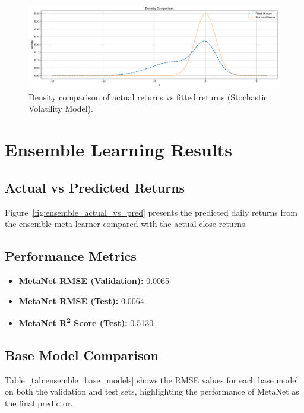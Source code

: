 \begin{figure}[h!]
    \centering
    \includegraphics[width=\textwidth]{Images/stochastic_volatility_density.pdf}
    \caption{Density comparison of actual returns vs fitted returns (Stochastic Volatility Model).}
    \label{fig:sv_density}
\end{figure}

\section{Ensemble Learning Results}

\subsection{Actual vs Predicted Returns}
Figure~\ref{fig:ensemble_actual_vs_pred} presents the predicted daily returns from the ensemble meta-learner compared with the actual close returns.

\subsection{Performance Metrics}
\begin{itemize}
    \item \textbf{MetaNet RMSE (Validation):} 0.0065
    \item \textbf{MetaNet RMSE (Test):} 0.0064
    \item \textbf{MetaNet R\textsuperscript{2} Score (Test):} 0.5130
\end{itemize}

\subsection{Base Model Comparison}
Table~\ref{tab:ensemble_base_models} shows the RMSE values for each base model on both the validation and test sets, highlighting the performance of MetaNet as the final predictor.

